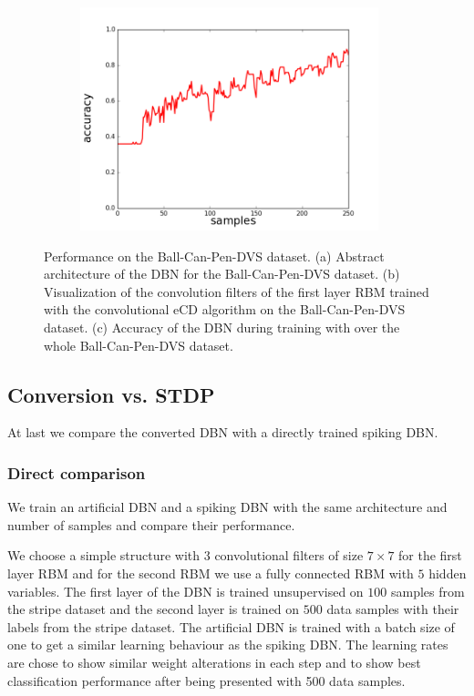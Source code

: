 \begin{figure}[h!]
\begin{subfigure}{.32\textwidth}
    	\includegraphics[width=0.95\textwidth]{imgs/bcp/acc.png} 
    \caption{}
	\label{fig:bcpacc}
	\end{subfigure}%
	\caption[Performance on the Ball-Can-Pen-DVS dataset.]{Performance on the Ball-Can-Pen-DVS dataset. (a) Abstract architecture of the DBN for the Ball-Can-Pen-DVS dataset. (b) Visualization of the convolution filters of the first layer RBM trained with the convolutional eCD algorithm on the Ball-Can-Pen-DVS dataset. (c) Accuracy of the DBN during training with over the whole Ball-Can-Pen-DVS dataset.}
\end{figure}

\subsection{Conversion vs. STDP} \label{c:comparisonexp}

At last we compare the converted DBN with a directly trained spiking DBN.

\subsubsection{Direct comparison}

We train an artificial DBN and a spiking DBN with the same architecture and number of samples and compare their performance.

We choose a simple structure with $3$ convolutional filters of size $7 \times 7$ for the first layer RBM and for the second RBM we use a fully connected RBM with $5$ hidden variables.
The first layer of the DBN is trained unsupervised on $100$ samples from the stripe dataset and the second layer is trained on $500$ data samples with their labels from the stripe dataset.
The artificial DBN is trained with a batch size of one to get a similar learning behaviour as the spiking DBN. 
The learning rates are chose to show similar weight alterations in each step and to show best classification performance after being presented with 500 data samples.

